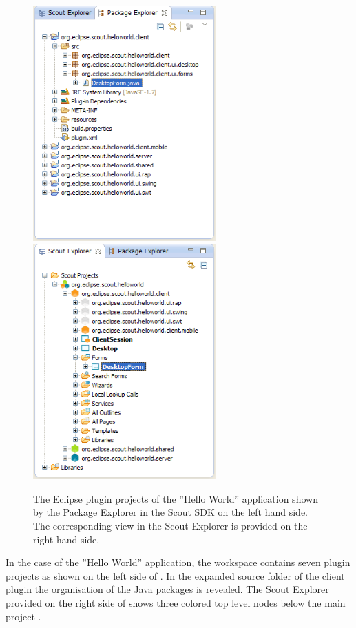 \documentclass[a4paper,10pt,twoside]{book}
\begin{document}
\begin{figure}
\includegraphics[width=7cm]{sdk_package_explorer.png} \hspace{0.5cm}
\includegraphics[width=7cm]{sdk_scout_explorer.png}
\caption{The Eclipse plugin projects of the ''Hello World'' application shown by the Package Explorer in the Scout SDK on the left hand side. 
The corresponding view in the Scout Explorer is provided on the right hand side.
}
\end{figure}

In the case of the ''Hello World'' application, the workspace contains seven plugin projects as shown on the left side of .
In the expanded source folder of the client plugin  the organisation of the Java packages is revealed.
The Scout Explorer provided on the right side of  shows three colored top level nodes below the main project .
\end{document}
